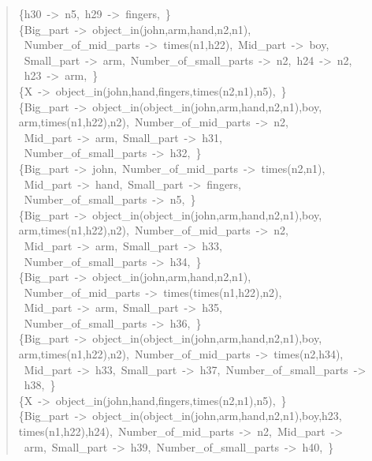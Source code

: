 \begin{quote}
\{h30~->~n5,~h29~->~fingers,~\}\\
\{Big\_part~->~object\_in(john,arm,hand,n2,n1),\\ ~Number\_of\_mid\_parts~->~times(n1,h22),~Mid\_part~->~boy,\\~Small\_part~->~arm,~Number\_of\_small\_parts~->~n2,~h24~->~n2,\\~h23~->~arm,~\}\\
\{X~->~object\_in(john,hand,fingers,times(n2,n1),n5),~\}\\
\{Big\_part~->~object\_in(object\_in(john,arm,hand,n2,n1),boy,\\ arm,times(n1,h22),n2),~Number\_of\_mid\_parts~->~n2,\\~Mid\_part~->~arm,~Small\_part~->~h31,\\~Number\_of\_small\_parts~->~h32,~\}\\
\{Big\_part~->~john,~Number\_of\_mid\_parts~->~times(n2,n1),\\ ~Mid\_part~->~hand,~Small\_part~->~fingers,\\~Number\_of\_small\_parts~->~n5,~\}\\
\{Big\_part~->~object\_in(object\_in(john,arm,hand,n2,n1),boy,\\ arm,times(n1,h22),n2),~Number\_of\_mid\_parts~->~n2,\\~Mid\_part~->~arm,~Small\_part~->~h33,\\~Number\_of\_small\_parts~->~h34,~\}\\
\{Big\_part~->~object\_in(john,arm,hand,n2,n1),\\ ~Number\_of\_mid\_parts~->~times(times(n1,h22),n2),\\~Mid\_part~->~arm,~Small\_part~->~h35,\\~Number\_of\_small\_parts~->~h36,~\}\\
\{Big\_part~->~object\_in(object\_in(john,arm,hand,n2,n1),boy,\\ arm,times(n1,h22),n2),~Number\_of\_mid\_parts~->~times(n2,h34),\\~Mid\_part~->~h33,~Small\_part~->~h37,~Number\_of\_small\_parts~->\\~h38,~\}\\
\{X~->~object\_in(john,hand,fingers,times(n2,n1),n5),~\}\\
\{Big\_part~->~object\_in(object\_in(john,arm,hand,n2,n1),boy,h23,\\ times(n1,h22),h24),~Number\_of\_mid\_parts~->~n2,~Mid\_part~->\\~arm,~Small\_part~->~h39,~Number\_of\_small\_parts~->~h40,~\}\\

\end{quote}
